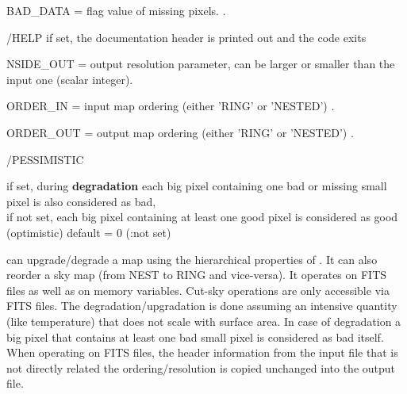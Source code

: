 \begin{keywords}
  \begin{kwlist}{} %
    \item[BAD\_DATA =] %
	flag value of missing pixels.
          .
    \item[/HELP] %
	 if set, the documentation header is printed out and the code exits
    \item[NSIDE\_OUT =] %
	 output resolution parameter, can be
    larger or smaller than the input one (scalar integer).
    \item[ORDER\_IN =] %
	input map ordering (either 'RING' or 'NESTED')
	.
    \item[ORDER\_OUT =] %
	output map ordering (either 'RING' or 'NESTED')
	.
    \item[/PESSIMISTIC] %
	\parbox[t]{0.5\hsize}{if set, during {\bf degradation} each big pixel containing one
    bad or missing small pixel is also considered as bad, \\
        if not set, each big pixel containing at least one good pixel
    is considered as good (optimistic)
       default = 0 (:not set)}
  \end{kwlist}
\end{keywords}  

\begin{codedescription}
{\facname{} can upgrade/degrade a \healpix map using the hierarchical
properties of \healpix. It can also reorder a sky map (from NEST to RING and
vice-versa). It operates on FITS files as well as on memory variables. Cut-sky
operations are only accessible via FITS files.
The degradation/upgradation is done assuming an
intensive quantity (like temperature) that does not scale with surface area. 
In case of degradation a big pixel that contains at least one bad small pixel is
considered as bad itself. When operating on FITS files, the header information
from the input file that is not directly related the ordering/resolution is
copied unchanged into the output file.}
\end{codedescription}



